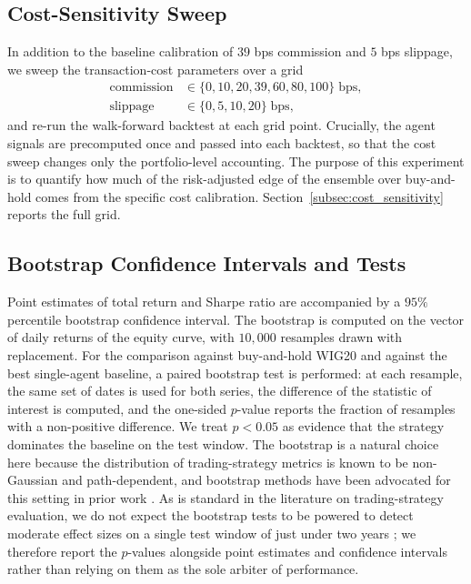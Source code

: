 \documentclass{ieeeaccess}
\begin{document}
\subsection{Cost-Sensitivity Sweep}
\label{subsec:costsweep}

In addition to the baseline calibration of $39$ bps commission and $5$ bps slippage, we sweep the transaction-cost parameters over a grid
\begin{equation}
\begin{aligned}
\mathrm{commission} &\in \{0, 10, 20, 39, 60, 80, 100\}\;\text{bps}, \\
\mathrm{slippage} &\in \{0, 5, 10, 20\}\;\text{bps},
\end{aligned}
\end{equation}
and re-run the walk-forward backtest at each grid point. Crucially, the agent signals are precomputed once and passed into each backtest, so that the cost sweep changes only the portfolio-level accounting. The purpose of this experiment is to quantify how much of the risk-adjusted edge of the ensemble over buy-and-hold comes from the specific cost calibration. Section~\ref{subsec:cost_sensitivity} reports the full grid.

\subsection{Bootstrap Confidence Intervals and Tests}
\label{subsec:bootstrap}

Point estimates of total return and Sharpe ratio are accompanied by a $95\%$ percentile bootstrap confidence interval. The bootstrap is computed on the vector of daily returns of the equity curve, with $10{,}000$ resamples drawn with replacement. For the comparison against buy-and-hold WIG20 and against the best single-agent baseline, a paired bootstrap test is performed: at each resample, the same set of dates is used for both series, the difference of the statistic of interest is computed, and the one-sided $p$-value reports the fraction of resamples with a non-positive difference. We treat $p < 0.05$ as evidence that the strategy dominates the baseline on the test window. The bootstrap is a natural choice here because the distribution of trading-strategy metrics is known to be non-Gaussian and path-dependent, and bootstrap methods have been advocated for this setting in prior work \cite{politis1994}. As is standard in the literature on trading-strategy evaluation, we do not expect the bootstrap tests to be powered to detect moderate effect sizes on a single test window of just under two years \cite{bailey2014}; we therefore report the $p$-values alongside point estimates and confidence intervals rather than relying on them as the sole arbiter of performance.
\end{document}

